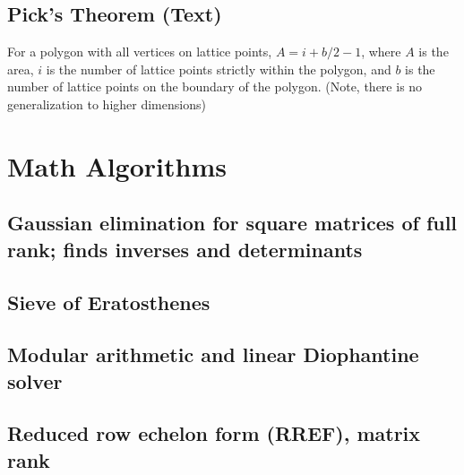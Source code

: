 \documentclass[9pt]{extarticle}
\begin{document}
\begin{multicols*}{3}
\subsection{Pick's Theorem (Text)} %
For a polygon with all vertices on lattice points, $A = i + b/2 - 1$, where $A$
is the area, $i$ is the number of lattice points strictly within the polygon,
and $b$ is the number of lattice points on the boundary of the polygon. (Note,
there is no generalization to higher dimensions)

\section{Math Algorithms}

\subsection{Gaussian elimination for square matrices of full rank; finds
inverses and determinants} %


\subsection{Sieve of Eratosthenes} %


\subsection{Modular arithmetic and linear Diophantine solver} %


\subsection{Reduced row echelon form (RREF), matrix rank} %



\end{multicols*}
\end{document}

